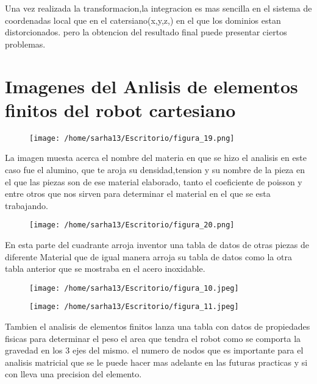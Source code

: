 \documentclass[letter,openright,12pt,spanish]{report}
\begin{document}
Una vez realizada la transformacion,la integracion es mas sencilla en el sistema de coordenadas local que en el catersiano(x,y,z,) en el que los dominios estan distorcionados. pero la obtencion del resultado final puede presentar ciertos problemas.

\newpage

\section{Imagenes del Anlisis de elementos finitos del robot cartesiano}

\begin{figure}[htp!]
\centering
\texttt{[image: /home/sarha13/Escritorio/figura\_19.png]}
\caption{}
\label{Figura 7.}
\end{figure}

La imagen muesta acerca el nombre del materia en que se hizo el analisis en este caso fue el alumino, que te aroja su densidad,tension y su nombre de la pieza en el que las piezas son de ese material elaborado, tanto el coeficiente de poisson y entre otros que nos sirven para determinar el material en el que se esta trabajando.

\begin{figure}[htp!]
\centering
\texttt{[image: /home/sarha13/Escritorio/figura\_20.png]}
\caption{}
\label{Figura 7.}
\end{figure}

En esta parte del cuadrante arroja inventor una tabla de datos de otras piezas de diferente Material que de igual manera arroja su tabla de datos como la otra tabla anterior que se mostraba en el acero inoxidable.

\begin{figure}[htp!]
\centering
\texttt{[image: /home/sarha13/Escritorio/figura\_10.jpeg]}
\caption{}
\label{Figura 11.}
\end{figure}

\begin{figure}[htp!]
\centering
\texttt{[image: /home/sarha13/Escritorio/figura\_11.jpeg]}
\caption{}
\label{Figura 7.}
\end{figure}

Tambien el analisis de elementos finitos lanza una tabla con datos de propiedades fisicas para determinar el peso el area que tendra el robot como se comporta la gravedad en los 3 ejes del mismo. el numero de nodos que es importante para el analisis matricial que se le puede hacer mas adelante en las futuras practicas y si con lleva una precision del elemento.
\end{document}
